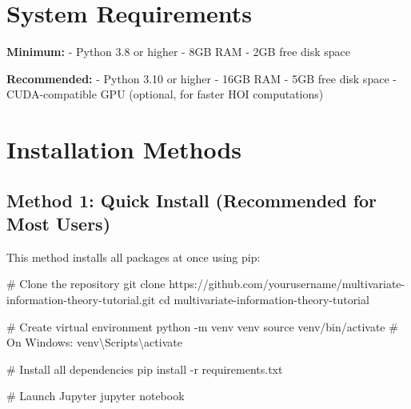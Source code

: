 \documentclass[
  11pt,
  letterpaper,
  oneside,
  openany]{book}
\newenvironment{Shaded}{\begin{snugshade}}{\end{snugshade}}
\newcommand{\AttributeTok}[1]{\textcolor[rgb]{0.40,0.45,0.13}{#1}}
\newcommand{\BuiltInTok}[1]{\textcolor[rgb]{0.00,0.23,0.31}{#1}}
\newcommand{\CommentTok}[1]{\textcolor[rgb]{0.37,0.37,0.37}{#1}}
\newcommand{\ExtensionTok}[1]{\textcolor[rgb]{0.00,0.23,0.31}{#1}}
\newcommand{\FunctionTok}[1]{\textcolor[rgb]{0.28,0.35,0.67}{#1}}
\newcommand{\NormalTok}[1]{\textcolor[rgb]{0.00,0.23,0.31}{#1}}
\begin{document}
\section*{System Requirements}\label{system-requirements}


\textbf{Minimum:} - Python 3.8 or higher - 8GB RAM - 2GB free disk space

\textbf{Recommended:} - Python 3.10 or higher - 16GB RAM - 5GB free disk
space - CUDA-compatible GPU (optional, for faster HOI computations)

\section*{Installation Methods}\label{installation-methods}


\subsection*{Method 1: Quick Install (Recommended for Most
Users)}\label{method-1-quick-install-recommended-for-most-users}

This method installs all packages at once using pip:

\begin{Shaded}
\begin{Highlighting}[]
\CommentTok{\# Clone the repository}
\FunctionTok{git}\NormalTok{ clone https://github.com/yourusername/multivariate{-}information{-}theory{-}tutorial.git}
\BuiltInTok{cd}\NormalTok{ multivariate{-}information{-}theory{-}tutorial}

\CommentTok{\# Create virtual environment}
\ExtensionTok{python} \AttributeTok{{-}m}\NormalTok{ venv venv}
\BuiltInTok{source}\NormalTok{ venv/bin/activate  }\CommentTok{\# On Windows: venv\textbackslash{}Scripts\textbackslash{}activate}

\CommentTok{\# Install all dependencies}
\ExtensionTok{pip}\NormalTok{ install }\AttributeTok{{-}r}\NormalTok{ requirements.txt}

\CommentTok{\# Launch Jupyter}
\ExtensionTok{jupyter}\NormalTok{ notebook}
\end{Highlighting}
\end{Shaded}
\end{document}

